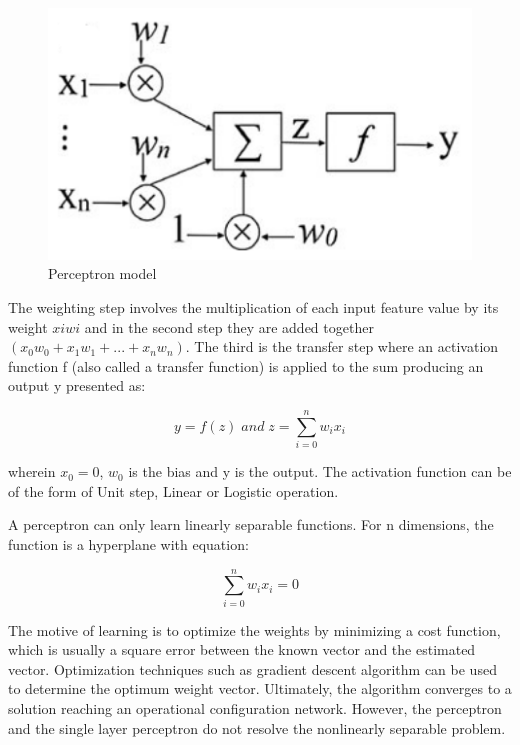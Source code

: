 \begin{figure}[h]
\centering
\includegraphics[]{./figures/perceptron.png}
\caption{Perceptron model}
\label{fig1}
\end{figure}

The weighting step involves the multiplication of each input feature value by its weight ${xiwi}$ and in the second step they are added together $(x_{0}w_{0} + x_{1}w_{1} + ... + x_{n}w_{n})$. The third is the transfer step where an activation function f (also called a transfer function) is applied to the sum producing an output y presented as:

\begin{equation}
    y = f(z)\;and\;z = \sum_{i=0}^{n} w_{i}x_{i}
\end{equation}

wherein $x_{0} = 0$, $w_{0}$ is the bias and y is the output. The activation function can be of the form of Unit step, Linear or Logistic operation. 

A perceptron can only learn linearly separable functions. For n dimensions, the function is a hyperplane with equation:

\begin{equation}
    \sum_{i=0}^{n} w_{i}x_{i} = 0
\end{equation}

The motive of learning is to optimize the weights by minimizing a cost function, which is usually a square error between the known vector and the estimated vector. Optimization techniques such as gradient descent algorithm can be used to determine the optimum weight vector. Ultimately, the algorithm converges to a solution reaching an operational configuration network. However, the perceptron and the single layer perceptron do not resolve the nonlinearly separable problem. 

